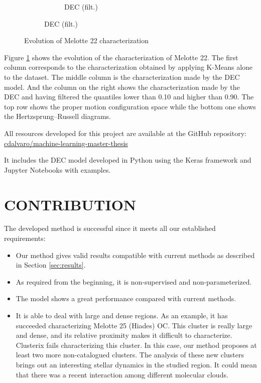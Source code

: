 \documentclass[11pt,a4paper,english,twocolumn]{article}
\begin{document}
\begin{figure}[htbp]
\begin{subfigure}{\columnwidth}
\begin{subfigure}[t]{0.3\textwidth}
      \caption{DEC (filt.)}
    \end{subfigure}
  \end{subfigure}
  \caption{Evolution of Melotte 22 characterization}
  \label{fig:melotte_22_characterization_evolution}
\end{figure}

Figure \ref{fig:melotte_22_characterization_evolution} shows the evolution
of the characterization of Melotte 22. The first column corresponds to the
characterization obtained by applying K-Means alone to the dataset. The middle
column is the characterization made by the DEC model. And the column on the right
shows the characterization made by the DEC and having filtered the quantiles
lower than 0.10 and higher than 0.90. The top row shows the proper motion
configuration space while the bottom one shows the Hertzsprung–Russell diagrams.

All resources developed for this project are available at the GitHub repository:
\href{https://github.com/cdalvaro/machine-learning-master-thesis}{cdalvaro/machine-learning-master-thesis}

It includes the DEC model developed in Python using the Keras framework
and Jupyter Notebooks \cite{Kluyver2016jupyter} with examples.

\section{CONTRIBUTION}

The developed method is successful since it meets all our established requirements:

\begin{itemize}
  \item Our method gives valid results compatible with current methods as described in Section \ref{sec:results}.
  \item As required from the beginning, it is non-supervised and non-parameterized.
  \item The model shows a great performance compared with current methods.
  \item It is able to deal with large and dense regions. As an example,
        it has succeeded characterizing Melotte 25 (Hiades) OC. This cluster is
        really large and dense, and its relative proximity makes it difficult to
        characterize. Clusterix fails characterizing this cluster. In this case,
        our method proposes at least two more non-catalogued clusters. The analysis
        of these new clusters brings out an interesting stellar dynamics in the studied
        region. It could mean that there was a recent interaction among different molecular clouds.
\end{itemize}
\end{document}
